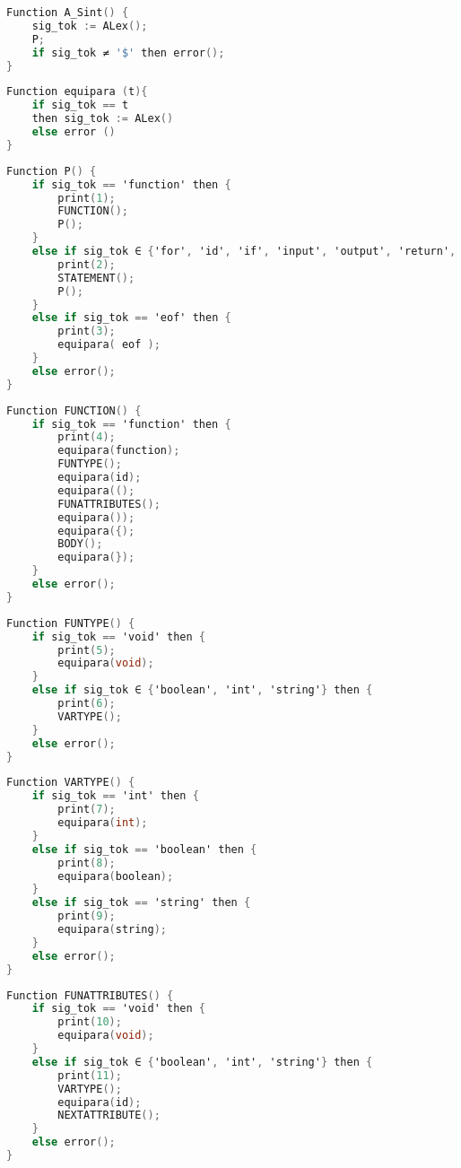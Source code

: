 \renewcommand{\lstlistingname}{Función} %

\begin{lstlisting}[language=C, caption={Main del Analizador Sintáctico}]
Function A_Sint() {
    sig_tok := ALex();
    P;
    if sig_tok ≠ '$' then error();
}
\end{lstlisting}

\begin{lstlisting}[language=C, caption={Equipara}]
Function equipara (t){
    if sig_tok == t
    then sig_tok := ALex()
    else error ()
}
\end{lstlisting}

\begin{lstlisting}[language=C, caption={P}]
Function P() {
    if sig_tok == 'function' then {
        print(1);
        FUNCTION();
        P();
    }
    else if sig_tok ∈ {'for', 'id', 'if', 'input', 'output', 'return', 'var'} then {
        print(2);
        STATEMENT();
        P();
    }
    else if sig_tok == 'eof' then {
        print(3);
        equipara( eof );
    }
    else error();
}
\end{lstlisting}

\begin{lstlisting}[language=C, caption={FUNCTION}]
Function FUNCTION() {
    if sig_tok == 'function' then {
        print(4);
        equipara(function);
        FUNTYPE();
        equipara(id);
        equipara(();
        FUNATTRIBUTES();
        equipara());
        equipara({);
        BODY();
        equipara(});
    }
    else error();
}
\end{lstlisting}

\begin{lstlisting}[language=C, caption={FUNTYPE}]
Function FUNTYPE() {
    if sig_tok == 'void' then {
        print(5);
        equipara(void);
    }
    else if sig_tok ∈ {'boolean', 'int', 'string'} then {
        print(6);
        VARTYPE();
    }
    else error();
}
\end{lstlisting}
\newpage
\begin{lstlisting}[language=C, caption={VARTYPE}]
Function VARTYPE() {
    if sig_tok == 'int' then {
        print(7);
        equipara(int);
    }
    else if sig_tok == 'boolean' then {
        print(8);
        equipara(boolean);
    }
    else if sig_tok == 'string' then {
        print(9);
        equipara(string);
    }
    else error();
}
\end{lstlisting}

\begin{lstlisting}[language=C, caption={FUNATTRIBUTES}]
Function FUNATTRIBUTES() {
    if sig_tok == 'void' then {
        print(10);
        equipara(void);
    }
    else if sig_tok ∈ {'boolean', 'int', 'string'} then {
        print(11);
        VARTYPE();
        equipara(id);
        NEXTATTRIBUTE();
    }
    else error();
}
\end{lstlisting}

